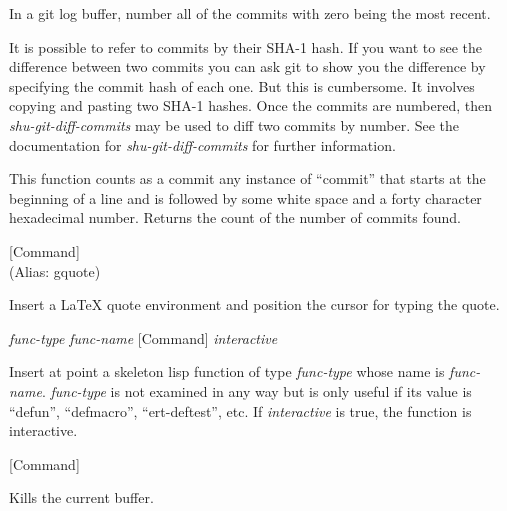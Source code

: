 \begin{doc-string}
In a git log buffer, number all of the commits with zero being the most
recent.

It is possible to refer to commits by their SHA-1 hash.  If you want to see the
difference between two commits you can ask git to show you the difference by
specifying the commit hash of each one.  But this is cumbersome.  It involves
copying and pasting two SHA-1 hashes.  Once the commits are numbered, then
\emph{shu-git-diff-commits} may be used to diff two commits by number.  See the
documentation for \emph{shu-git-diff-commits} for further information.

This function counts as a commit any instance of ``commit'' that starts at the
beginning of a line and is followed by some white space and a forty character
hexadecimal number.  Returns the count of the number of commits found.
\end{doc-string}

\vspace{1em}
\noindent
{}
\usebox{\funcname}
 \hfill [Command]\\%
 (Alias: gquote)

\begin{doc-string}
Insert a LaTeX quote environment and position the cursor for typing the quote.
\end{doc-string}

\vspace{1em}
\noindent
{}
\usebox{\funcname}\emph{func-type} \emph{func-name}
 \hfill [Command]
\hspace*{\wd\funcname}\emph{interactive}

\begin{doc-string}
Insert at point a skeleton lisp function of type \emph{func-type} whose name is
\emph{func-name}.  \emph{func-type} is not examined in any way but is only useful if its
value is ``defun'', ``defmacro'', ``ert-deftest'', etc.  If \emph{interactive} is
true, the function is interactive.
\end{doc-string}

\vspace{1em}
\noindent
{}
\usebox{\funcname}
 \hfill [Command]

\begin{doc-string}
Kills the current buffer.
\end{doc-string}

